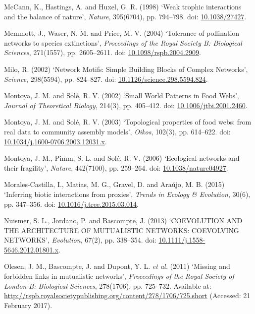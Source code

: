 \documentclass[12pt]{article}
\begin{document}
\hypertarget{ref-mcca98wti}{}
McCann, K., Hastings, A. and Huxel, G. R. (1998) `Weak trophic
interactions and the balance of nature', \emph{Nature}, 395(6704), pp.
794--798. doi: \href{https://doi.org/10.1038/27427}{10.1038/27427}.

\hypertarget{ref-memm04tpn}{}
Memmott, J., Waser, N. M. and Price, M. V. (2004) `Tolerance of
pollination networks to species extinctions', \emph{Proceedings of the
Royal Society B: Biological Sciences}, 271(1557), pp. 2605--2611. doi:
\href{https://doi.org/10.1098/rspb.2004.2909}{10.1098/rspb.2004.2909}.

\hypertarget{ref-milo02nms}{}
Milo, R. (2002) `Network Motifs: Simple Building Blocks of Complex
Networks', \emph{Science}, 298(5594), pp. 824--827. doi:
\href{https://doi.org/10.1126/science.298.5594.824}{10.1126/science.298.5594.824}.

\hypertarget{ref-mont02swp}{}
Montoya, J. M. and Solé, R. V. (2002) `Small World Patterns in Food
Webs', \emph{Journal of Theoretical Biology}, 214(3), pp. 405--412. doi:
\href{https://doi.org/10.1006/jtbi.2001.2460}{10.1006/jtbi.2001.2460}.

\hypertarget{ref-mont03tpf}{}
Montoya, J. M. and Solé, R. V. (2003) `Topological properties of food
webs: from real data to community assembly models', \emph{Oikos},
102(3), pp. 614--622. doi:
\href{https://doi.org/10.1034/j.1600-0706.2003.12031.x}{10.1034/j.1600-0706.2003.12031.x}.

\hypertarget{ref-mont06ent}{}
Montoya, J. M., Pimm, S. L. and Solé, R. V. (2006) `Ecological networks
and their fragility', \emph{Nature}, 442(7100), pp. 259--264. doi:
\href{https://doi.org/10.1038/nature04927}{10.1038/nature04927}.

\hypertarget{ref-mora15ibi}{}
Morales-Castilla, I., Matias, M. G., Gravel, D. and Araújo, M. B. (2015)
`Inferring biotic interactions from proxies', \emph{Trends in Ecology \&
Evolution}, 30(6), pp. 347--356. doi:
\href{https://doi.org/10.1016/j.tree.2015.03.014}{10.1016/j.tree.2015.03.014}.

\hypertarget{ref-nuis13cam}{}
Nuismer, S. L., Jordano, P. and Bascompte, J. (2013) `COEVOLUTION AND
THE ARCHITECTURE OF MUTUALISTIC NETWORKS: COEVOLVING NETWORKS',
\emph{Evolution}, 67(2), pp. 338--354. doi:
\href{https://doi.org/10.1111/j.1558-5646.2012.01801.x}{10.1111/j.1558-5646.2012.01801.x}.

\hypertarget{ref-oles11mfl}{}
Olesen, J. M., Bascompte, J. and Dupont, Y. L. \emph{et al.} (2011)
`Missing and forbidden links in mutualistic networks', \emph{Proceedings
of the Royal Society of London B: Biological Sciences}, 278(1706), pp.
725--732. Available at:
\url{http://rspb.royalsocietypublishing.org/content/278/1706/725.short}
(Accessed: 21 February 2017).
\end{document}
